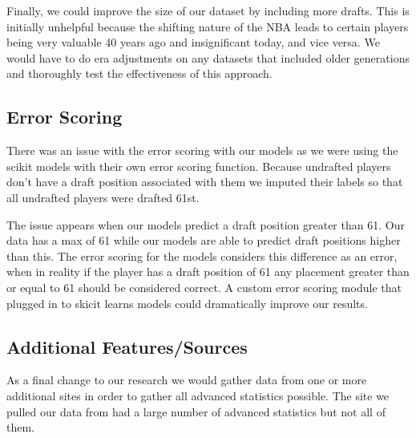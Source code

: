 \documentclass{article}
\begin{document}
Finally, we could improve the size of our dataset by including more drafts. This
is initially unhelpful because the shifting nature of the NBA leads to certain
players being very valuable 40 years ago and insignificant today, and vice
versa. We would have to do era adjustments on any datasets that included older
generations and thoroughly test the effectiveness of this approach.

\subsection{Error Scoring}

There was an issue with the error scoring with our models as we were using the
scikit models with their own error scoring function. Because undrafted players
don’t have a draft position associated with them we imputed their labels so that
all undrafted players were drafted 61st. 

The issue appears when our models predict a draft position greater than 61. Our
data has a max of 61 while our models are able to predict draft positions higher
than this. The error scoring for the models considers this difference as an
error, when in reality if the player has a draft position of 61 any placement
greater than or equal to 61 should be considered correct. A custom error scoring
module that plugged in to skicit learns models could dramatically improve our
results.

\subsection{Additional Features/Sources}

As a final change to our research we would gather data from one or more
additional sites in order to gather all advanced statistics possible. The site
we pulled our data from had a large number of advanced statistics but not all of
them.
\end{document}
